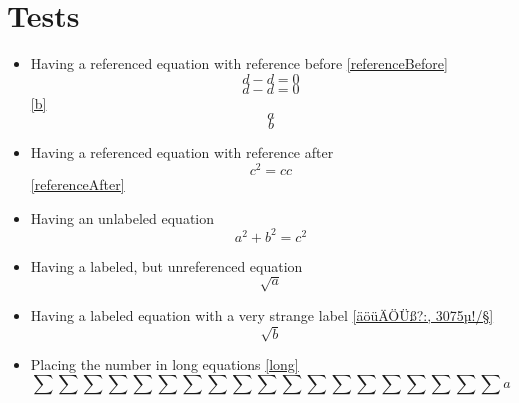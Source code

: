 \documentclass{article}
\begin{document}

	\section*{Tests}
	\begin{itemize}
		\item Having a referenced equation with reference before \ref{referenceBefore}
			\begin{equation}\label{referenceBefore}
				d - d = 0
			\end{equation}
			\begin{equation}\label{referenceNo}
				d - d = 0
			\end{equation}
		\ref{b}\begin{equation}\label{a}a\end{equation}\begin{equation}\label{b}b\end{equation}
		\item Having a referenced equation with reference after
			\begin{equation}\label{referenceAfter}
				c^2 = c c
			\end{equation}
			\ref{referenceAfter}
		\item Having an unlabeled equation
			\begin{equation}\label{abc}
				a^2 + b^2 = c^2
			\end{equation}
		\item Having a labeled, but unreferenced equation
			\begin{equation}\label{unreferenced}
				\sqrt{a}
			\end{equation}
		\item Having a labeled equation with a very strange label \ref{äöüÄÖÜß?:, 3075µ!/§}
			\begin{equation}\label{äöüÄÖÜß?:, 3075µ!/§}
				\sqrt{b}
			\end{equation}
		\item Placing the number in long equations \ref{long}
			\begin{equation}\label{long}
				\sum\sum\sum\sum\sum\sum\sum\sum\sum\sum\sum\sum\sum\sum\sum\sum\sum\sum\sum a

\end{equation}
\end{itemize}
\end{document}
